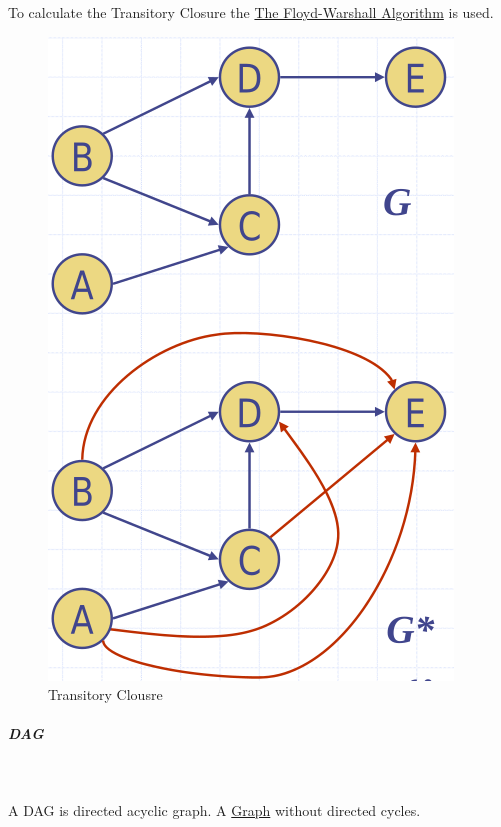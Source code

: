 \documentclass[11pt,twoside,twocolumn,landscape]{article}
\begin{document}
To calculate the Transitory Closure the \href{../../../roam/20220202113404-the_floyd_warshall_algorithm.org}{The Floyd-Warshall Algorithm} is used.


\begin{figure}[htbp]
\centering
\includegraphics[width=.9\linewidth]{img/transitiver_abschluss.png}
\caption{\label{fig:orgdcb8f99}Transitory Clousre}
\end{figure}

\subparagraph{DAG} \
\label{sec:orgb4697d4}

A DAG is directed acyclic graph.
A \href{../../../roam/20220201163000-graph.org}{Graph} without directed cycles.
\end{document}
